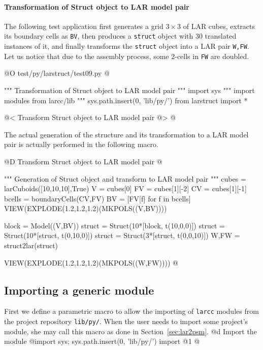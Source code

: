 \documentclass[11pt,oneside]{article}    %
\begin{document}
\paragraph{Transformation of Struct object to LAR model pair}

The following test application first generates a grid $3\times 3$ of LAR cubes, extracts
its boundary cells as \texttt{BV}, then produces a \texttt{struct} object with 30 translated instances of it,
and finally transforms the \texttt{struct} object into a LAR pair \texttt{W,FW}.
Let us notice that due to the assembly process, some 2-cells in \texttt{FW} are doubled.

@O test/py/larstruct/test09.py
@{""" Transformation of Struct object to LAR model pair """
import sys
""" import modules from larcc/lib """
sys.path.insert(0, 'lib/py/')
from larstruct import *

@< Transform Struct object to LAR model pair @>
@}

The actual generation of the structure and its transformation to a LAR model pair is actually performed in the following macro.

@D Transform Struct object to LAR model pair
@{""" Generation of Struct object and transform to LAR model pair """
cubes = larCuboids([10,10,10],True)
V = cubes[0]
FV = cubes[1][-2]
CV = cubes[1][-1]
bcells = boundaryCells(CV,FV)
BV = [FV[f] for f in bcells]
VIEW(EXPLODE(1.2,1.2,1.2)(MKPOLS((V,BV))))

block = Model((V,BV))
struct = Struct(10*[block, t(10,0,0)])
struct = Struct(10*[struct, t(0,10,0)])
struct = Struct(3*[struct, t(0,0,10)])
W,FW = struct2lar(struct)

VIEW(EXPLODE(1.2,1.2,1.2)(MKPOLS((W,FW))))
@}



\appendix
\subsection{Importing a generic module}
First we define a parametric macro to allow the importing of \texttt{larcc} modules from the project repository \texttt{lib/py/}. When the user needs to import some project's module, she may call this macro as done in Section~\ref{sec:lar2psm}.
@d Import the module
@{import sys; sys.path.insert(0, 'lib/py/')
import @1
@}
\end{document}
